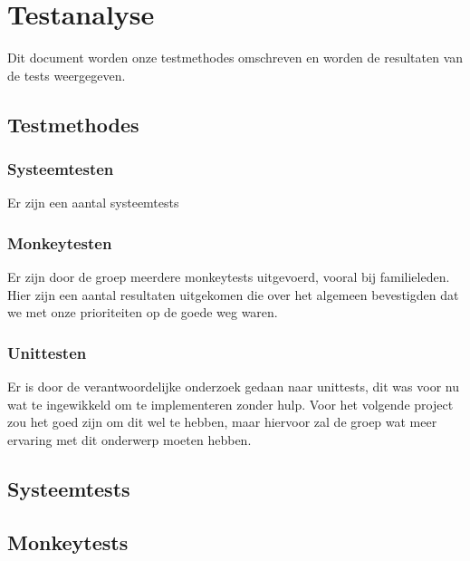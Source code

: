 

\tableofcontents

\section{Testanalyse}

Dit document worden onze testmethodes omschreven en worden de resultaten van de tests weergegeven.

\subsection{Testmethodes}

\subsubsection{Systeemtesten}

Er zijn een aantal systeemtests 

\subsubsection{Monkeytesten}

Er zijn door de groep meerdere monkeytests uitgevoerd, vooral bij familieleden.
Hier zijn een aantal resultaten uitgekomen die over het algemeen bevestigden dat we met onze prioriteiten op de goede weg waren.

\subsubsection{Unittesten}

Er is door de verantwoordelijke onderzoek gedaan naar unittests,
dit was voor nu wat te ingewikkeld om te implementeren zonder hulp.
Voor het volgende project zou het goed zijn om dit wel te hebben,
maar hiervoor zal de groep wat meer ervaring met dit onderwerp moeten hebben.

\subsection{Systeemtests}



\subsection{Monkeytests}




